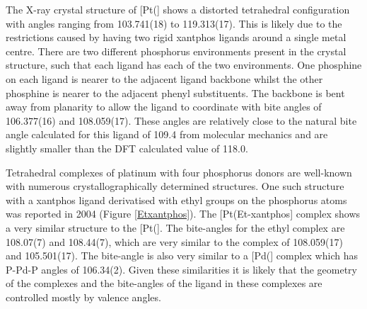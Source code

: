 The X-ray crystal structure of [Pt(\Phthixantphos{}] shows a distorted tetrahedral configuration with angles ranging from 103.741(18) to 119.313(17)\degrees.  This is likely due to the restrictions caused by having two rigid xantphos ligands around a single metal centre.  There are two different phosphorus environments present in the crystal structure, such that each ligand has each of the two environments.  One phosphine on each ligand is nearer to the adjacent ligand backbone whilst the other phosphine is nearer to the adjacent phenyl substituents.  The backbone is bent away from planarity to allow the ligand to coordinate with bite angles of 106.377(16) and 108.059(17)\degrees. These angles are relatively close to the natural bite angle calculated for this ligand of 109.4\degrees{} from molecular mechanics and are slightly smaller than the DFT calculated value of 118.0\degrees.\cite{Birkholz2009}

Tetrahedral complexes of platinum with four phosphorus donors are well-known with numerous crystallographically determined structures.\cite{Allen2002}  One such structure with a xantphos ligand derivatised with ethyl groups on the phosphorus atoms was reported in 2004 (Figure \ref{Etxantphos}).\cite{Miedaner2004}  The [Pt(Et-xantphos] complex shows a very similar structure to the [Pt(\Phthixantphos{}].  The bite-angles for the ethyl complex are 108.07(7) and 108.44(7)\degrees, which are very similar to the \Phthixantphos{} complex of 108.059(17) and 105.501(17)\degrees.  The bite-angle is also very similar to a [Pd(\Phxantphos{}] complex which has P-Pd-P angles of 106.34(2)\degrees{}.\cite{Grushin2006} Given these similarities it is likely that the geometry of the complexes and the bite-angles of the ligand in these complexes are controlled mostly by valence angles. 



